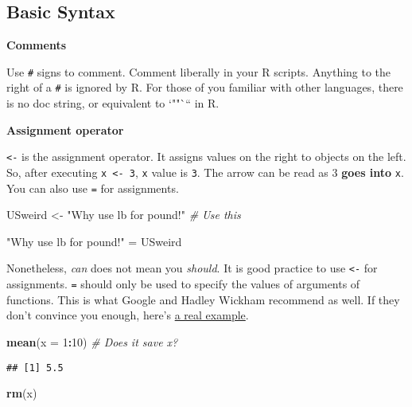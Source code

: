 \documentclass[
]{book}
\newenvironment{Shaded}{\begin{snugshade}}{\end{snugshade}}
\newcommand{\CommentTok}[1]{\textcolor[rgb]{0.56,0.35,0.01}{\textit{#1}}}
\newcommand{\DataTypeTok}[1]{\textcolor[rgb]{0.13,0.29,0.53}{#1}}
\newcommand{\DecValTok}[1]{\textcolor[rgb]{0.00,0.00,0.81}{#1}}
\newcommand{\KeywordTok}[1]{\textcolor[rgb]{0.13,0.29,0.53}{\textbf{#1}}}
\newcommand{\NormalTok}[1]{#1}
\newcommand{\OperatorTok}[1]{\textcolor[rgb]{0.81,0.36,0.00}{\textbf{#1}}}
\newcommand{\StringTok}[1]{\textcolor[rgb]{0.31,0.60,0.02}{#1}}
\begin{document}
\hypertarget{basic-syntax}{%
\subsection{Basic Syntax}\label{basic-syntax}}

\textbf{Comments}

Use \texttt{\#} signs to comment. Comment liberally in your R scripts. Anything to the right of a \texttt{\#} is ignored by R. For those of you familiar with other languages, there is no doc string, or equivalent to `""``` in R.

\textbf{Assignment operator}

\texttt{\textless{}-} is the assignment operator. It assigns values on the right to objects on the left. So, after executing \texttt{x\ \textless{}-\ 3}, \texttt{x} value is \texttt{3}. The arrow can be read as 3 \textbf{goes into} \texttt{x}. You can also use \texttt{=} for assignments.

\begin{Shaded}
\begin{Highlighting}[]
\NormalTok{USweird \textless{}{-}}\StringTok{ "Why use lb for pound!"} \CommentTok{\# Use this}

\StringTok{"Why use lb for pound!"}\NormalTok{ =}\StringTok{ }\NormalTok{USweird}
\end{Highlighting}
\end{Shaded}

Nonetheless, \emph{can} does not mean you \emph{should}. It is good practice to use \texttt{\textless{}-} for assignments. \texttt{=} should only be used to specify the values of arguments of functions. This is what Google and Hadley Wickham recommend as well. If they don't convince you enough, here's \href{https://csgillespie.wordpress.com/2010/11/16/assignment-operators-in-r-vs/}{a real example}.

\begin{Shaded}
\begin{Highlighting}[]
\KeywordTok{mean}\NormalTok{(}\DataTypeTok{x =} \DecValTok{1}\OperatorTok{:}\DecValTok{10}\NormalTok{) }\CommentTok{\# Does it save x?}
\end{Highlighting}
\end{Shaded}

\begin{verbatim}
## [1] 5.5
\end{verbatim}

\begin{Shaded}
\begin{Highlighting}[]
\KeywordTok{rm}\NormalTok{(x)}
\end{Highlighting}
\end{Shaded}
\end{document}
